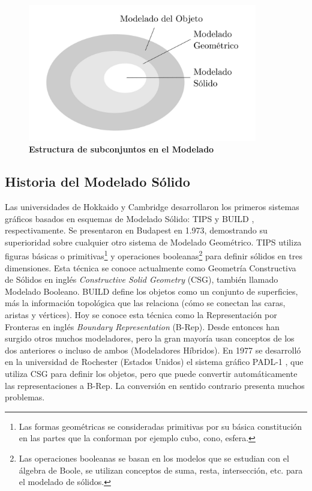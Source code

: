 \begin{figure}[h]
\includegraphics[width=10cm]{Img/GEO/geo-modelado0.jpg}
\centering
\caption{\textbf{\footnotesize{Estructura de subconjuntos en el Modelado}}}
\end{figure}


\subsection{ Historia del Modelado Sólido }
Las universidades de Hokkaido y Cambridge desarrollaron los primeros sistemas gráficos basados en esquemas de Modelado Sólido: TIPS y BUILD \citep{Toriya:1993:CPA:562297}, respectivamente. Se presentaron en Budapest en 1.973, demostrando su superioridad sobre cualquier otro sistema de Modelado Geométrico.
TIPS utiliza figuras básicas o primitivas\footnote{ Las formas geométricas se consideradas primitivas por su básica constitución en las partes que la conforman por ejemplo cubo, cono, esfera.} y operaciones booleanas\footnote{Las operaciones booleanas se basan en los modelos que se estudian con el álgebra de Boole, se utilizan conceptos de suma, resta, intersección, etc. para el modelado de sólidos.} para definir sólidos en tres dimensiones. Esta técnica se conoce actualmente como Geometría Constructiva de Sólidos en inglés \textit{Constructive Solid Geometry} (CSG), también llamado Modelado Booleano.
BUILD define los objetos como un conjunto de superficies, más la información topológica que las relaciona (cómo se conectan las caras, aristas y vértices). Hoy se conoce esta técnica como la Representación por Fronteras en inglés \textit{Boundary Representation} (B-Rep).
Desde entonces han surgido otros muchos modeladores, pero la gran mayoría usan conceptos de los dos anteriores o incluso de ambos (Modeladores Híbridos).
En 1977 se desarrolló en la universidad de Rochester (Estados Unidos) el sistema gráfico PADL-1 \citep{Toriya:1993:CPA:562297}, que utiliza CSG para definir los objetos, pero que puede convertir automáticamente las representaciones a B-Rep. La conversión en sentido contrario presenta muchos problemas. 

